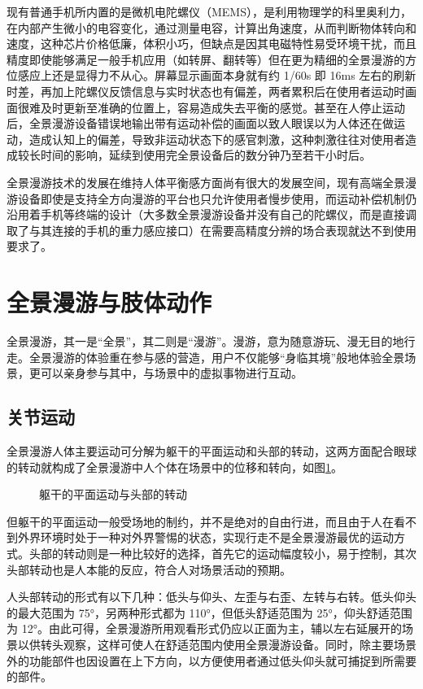 现有普通手机所内置的是微机电陀螺仪（MEMS），是利用物理学的科里奥利力，在内部产生微小的电容变化，通过测量电容，计算出角速度，从而判断物体转向和速度，这种芯片价格低廉，体积小巧，但缺点是因其电磁特性易受环境干扰，而且精度即使能够满足一般手机应用（如转屏、翻转等）但在更为精细的全景漫游的方位感应上还是显得力不从心。屏幕显示画面本身就有约 1/60s 即 16ms 左右的刷新时差，再加上陀螺仪反馈信息与实时状态也有偏差，两者累积后在使用者运动时画面很难及时更新至准确的位置上，容易造成失去平衡的感觉。甚至在人停止运动后，全景漫游设备错误地输出带有运动补偿的画面以致人眼误以为人体还在做运动，造成认知上的偏差，导致非运动状态下的感官刺激，这种刺激往往对使用者造成较长时间的影响，延续到使用完全景设备后的数分钟乃至若干小时后。

全景漫游技术的发展在维持人体平衡感方面尚有很大的发展空间，现有高端全景漫游设备即使是支持全方向漫游的平台也只允许使用者慢步使用，而运动补偿机制仍沿用着手机等终端的设计（大多数全景漫游设备并没有自己的陀螺仪，而是直接调取了与其连接的手机的重力感应接口）在需要高精度分辨的场合表现就达不到使用要求了。

\section{全景漫游与肢体动作}

全景漫游，其一是“全景”，其二则是“漫游”。漫游，意为随意游玩、漫无目的地行走。全景漫游的体验重在参与感的营造，用户不仅能够“身临其境”般地体验全景场景，更可以亲身参与其中，与场景中的虚拟事物进行互动。

\subsection{关节运动}

全景漫游人体主要运动可分解为躯干的平面运动和头部的转动，这两方面配合眼球的转动就构成了全景漫游中人个体在场景中的位移和转向，如图\ref{fig:act}。

\begin{figure}[htp]
\centering
{}
\caption{躯干的平面运动与头部的转动}
\label{fig:act}
\end{figure}

但躯干的平面运动一般受场地的制约，并不是绝对的自由行进，而且由于人在看不到外界环境时处于一种对外界警惕的状态，实现行走不是全景漫游最优的运动方式。头部的转动则是一种比较好的选择，首先它的运动幅度较小，易于控制，其次头部转动也是人本能的反应，符合人对场景活动的预期。

人头部转动的形式有以下几种：低头与仰头、左歪与右歪、左转与右转。低头仰头的最大范围为 75°，另两种形式都为 110°，但低头舒适范围为 25°，仰头舒适范围为 12°。由此可得，全景漫游所用观看形式仍应以正面为主，辅以左右延展开的场景以供转头观察，这样可使人在舒适范围内使用全景漫游设备。同时，除主要场景外的功能部件也因设置在上下方向，以方便使用者通过低头仰头就可捕捉到所需要的部件。

